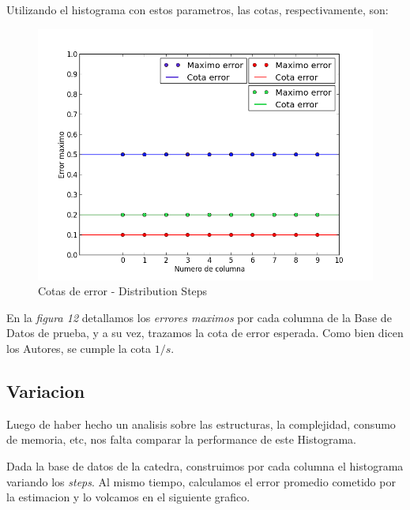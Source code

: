 \documentclass[10pt, a4paper,english,spanish,hidelinks]{article}
\begin{document}
{{Utilizando el histograma con estos parametros, las cotas, respectivamente, son:

\begin{figure}
  \centering
  \includegraphics[scale=0.6]{./imagenes/ejc2_cota_juntos.png}
  \caption{Cotas de error - Distribution Steps}
\end{figure}

En la \textit{figura 12} detallamos los \textit{errores maximos} por cada columna de la Base de Datos de prueba, y a su vez, trazamos la cota de error esperada.
Como bien dicen los Autores, se cumple la cota $1/s$.


\subsection{Variacion}

Luego de haber hecho un analisis sobre las estructuras, la complejidad, consumo de memoria, etc, nos falta comparar la performance de este Histograma.

Dada la base de datos de la catedra, construimos por cada columna el histograma variando los \textit{steps}. Al mismo tiempo, calculamos el error promedio cometido por la estimacion y lo volcamos en el siguiente grafico.

}}
\end{document}
